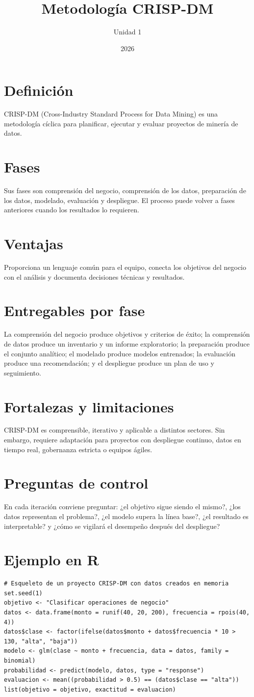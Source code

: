 \documentclass[12pt,a4paper]{article}
\title{Metodología CRISP-DM}
\author{Unidad 1}
\date{2026}
\begin{document}
\maketitle
\section{Definición}
CRISP-DM (Cross-Industry Standard Process for Data Mining) es una metodología cíclica para planificar, ejecutar y evaluar proyectos de minería de datos.
\section{Fases}
Sus fases son comprensión del negocio, comprensión de los datos, preparación de los datos, modelado, evaluación y despliegue. El proceso puede volver a fases anteriores cuando los resultados lo requieren.
\section{Ventajas}
Proporciona un lenguaje común para el equipo, conecta los objetivos del negocio con el análisis y documenta decisiones técnicas y resultados.
\section{Entregables por fase}
La comprensión del negocio produce objetivos y criterios de éxito; la comprensión de datos produce un inventario y un informe exploratorio; la preparación produce el conjunto analítico; el modelado produce modelos entrenados; la evaluación produce una recomendación; y el despliegue produce un plan de uso y seguimiento.
\section{Fortalezas y limitaciones}
CRISP-DM es comprensible, iterativo y aplicable a distintos sectores. Sin embargo, requiere adaptación para proyectos con despliegue continuo, datos en tiempo real, gobernanza estricta o equipos ágiles.
\section{Preguntas de control}
En cada iteración conviene preguntar: ¿el objetivo sigue siendo el mismo?, ¿los datos representan el problema?, ¿el modelo supera la línea base?, ¿el resultado es interpretable? y ¿cómo se vigilará el desempeño después del despliegue?
\section{Ejemplo en R}
\begin{lstlisting}
# Esqueleto de un proyecto CRISP-DM con datos creados en memoria
set.seed(1)
objetivo <- "Clasificar operaciones de negocio"
datos <- data.frame(monto = runif(40, 20, 200), frecuencia = rpois(40, 4))
datos$clase <- factor(ifelse(datos$monto + datos$frecuencia * 10 > 130, "alta", "baja"))
modelo <- glm(clase ~ monto + frecuencia, data = datos, family = binomial)
probabilidad <- predict(modelo, datos, type = "response")
evaluacion <- mean((probabilidad > 0.5) == (datos$clase == "alta"))
list(objetivo = objetivo, exactitud = evaluacion)
\end{lstlisting}
\end{document}
